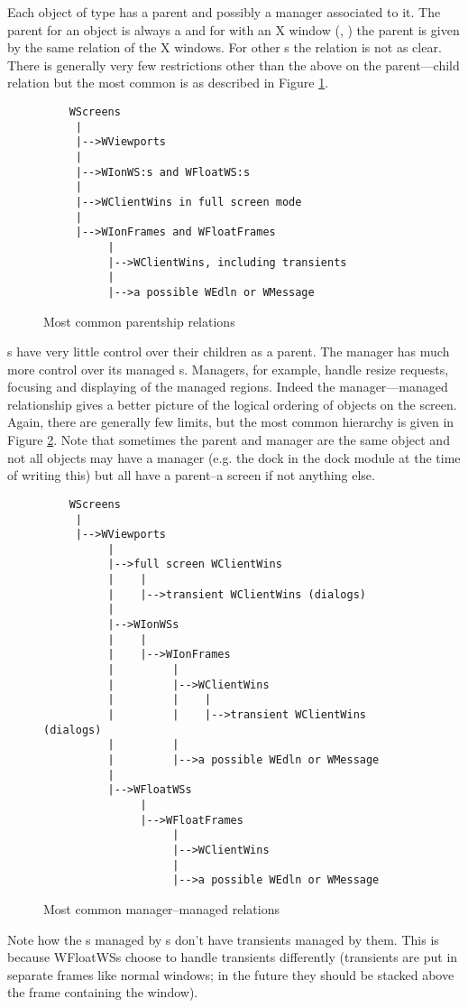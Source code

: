 
Each object of type  has a parent and possibly a manager
associated to it. The parent for an object is always a 
 and for  with an X window (,
) the parent  is given by the same relation of
the X windows. For other s the relation is not as clear.
There is generally very few restrictions other than the above on the
parent---child relation but the most common is as described in
Figure \ref{fig:parentship}.

\begin{figure}
\begin{verbatim}
    WScreens
     |
     |-->WViewports
     |
     |-->WIonWS:s and WFloatWS:s
     |
     |-->WClientWins in full screen mode
     |
     |-->WIonFrames and WFloatFrames
          |
          |-->WClientWins, including transients
          |
          |-->a possible WEdln or WMessage
\end{verbatim}
\caption{Most common parentship relations}
\label{fig:parentship}
\end{figure}

s have very little control over their children as a parent.
The manager  has much more control over its
managed s. Managers, for example, handle resize requests,
focusing and displaying of the managed regions. Indeed the manager---managed
relationship gives a better picture of the logical ordering of objects on
the screen. Again, there are generally few limits, but the most common
hierarchy is given in Figure \ref{fig:managership}. Note that sometimes
the parent and manager are the same object and not all objects may have
a manager (e.g. the dock in the dock module at the time of writing this)
but all have a parent--a screen if not anything else.

\begin{figure}
\begin{verbatim}
    WScreens
     |
     |-->WViewports
          |
          |-->full screen WClientWins
          |    |
          |    |-->transient WClientWins (dialogs)
          |
          |-->WIonWSs
          |    |
          |    |-->WIonFrames
          |         |
          |         |-->WClientWins
          |         |    |
          |         |    |-->transient WClientWins (dialogs)
          |         |
          |         |-->a possible WEdln or WMessage
          |
          |-->WFloatWSs
               |
               |-->WFloatFrames
                    |
                    |-->WClientWins
                    |
                    |-->a possible WEdln or WMessage
\end{verbatim}
\caption{Most common manager--managed relations}
\label{fig:managership}
\end{figure}

Note how the s managed by s don't have
transients managed by them. This is because WFloatWSs choose to handle
transients differently (transients are put in separate frames like normal
windows; in the future they should be stacked above the frame containing the
 window).
